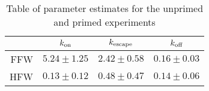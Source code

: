 \documentclass{article}
\newcommand{\tn}{\textnormal}
\begin{document}
\begin{table}[h]
  \centering
  \begin{tabular}{rccc} \toprule
    & $k_\tn{on}$ & $k_\tn{escape}$ & $k_\tn{off}$ \\ \midrule
    FFW & $5.24 \pm 1.25$ & $2.42 \pm 0.58$ & $0.16 \pm 0.03$ \\
    HFW & $0.13 \pm 0.12$ & $0.48 \pm 0.47$ & $0.14 \pm 0.06$ \\
    \bottomrule 
  \end{tabular}
  \caption{Table of parameter estimates for the unprimed and primed
    experiments}
  \label{tab:par-est}
\end{table}



\end{document}
